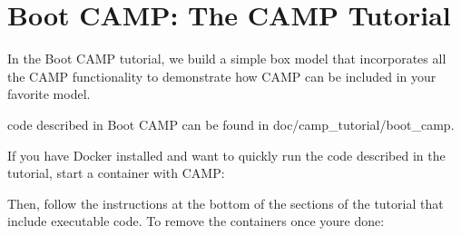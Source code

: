 \chapter{Boot CAMP\+: The CAMP Tutorial}
\hypertarget{camp_tutorial}{}\label{camp_tutorial}
In the Boot CAMP tutorial, we build a simple box model that incorporates all the CAMP functionality to demonstrate how CAMP can be included in your favorite model.


\begin{DoxyItemize}
\item {}
\item {}
\item {}
\item {}
\item {}
\item {}
\item {}
\item {}
\end{DoxyItemize}

 code described in Boot CAMP can be found in {\ttfamily doc/camp\+\_\+tutorial/boot\+\_\+camp}.

If you have Docker installed and want to quickly run the code described in the tutorial, start a container with CAMP\+: 
\begin{DoxyCode}{0}

\end{DoxyCode}
 Then, follow the instructions at the bottom of the sections of the tutorial that include executable code. To remove the containers once you\textquotesingle{}re done\+: 
\begin{DoxyCode}{0}

\end{DoxyCode}
 